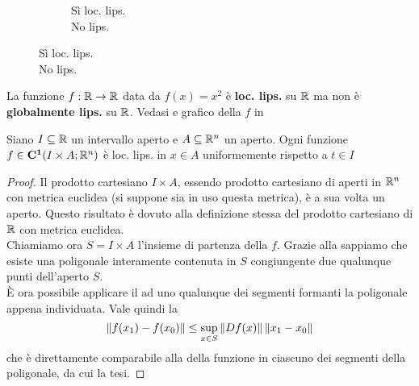 \begin{example}
\begin{figure}[H]
\begin{subfigure}{.24\textwidth}
{
			}
			\caption{Sì loc. lips.\\ No lips.}
		\end{subfigure}
	\end{figure}
\end{example}
\begin{example}
	La funzione $f:\mathbb{R}\to \mathbb{R}$ data da $f(x)=x^2$ è \textbf{loc. lips.} su $\mathbb{R}$ ma non è \textbf{globalmente lips.} su $\mathbb{R}$. Vedasi  e grafico della $f$ in 
\end{example}

\begin{proposition}
	\label{prop:fc1_loc_lips}
	Siano $I\subseteq \mathbb{R}$ un intervallo aperto e $A\subseteq \mathbb{R}^n$ un aperto. Ogni funzione $f\in\mathbf{C^{1}}(I\times A;\mathbb{R}^n)$ è loc. lips. in $x\in A$ uniformemente rispetto a $t\in I$
	\begin{proof}
		Il prodotto cartesiano $I\times A$, essendo prodotto cartesiano di aperti in $\mathbb{R}^n$ con metrica euclidea (si suppone sia in uso questa metrica), è a sua volta un aperto. Questo risultato è dovuto alla definizione stessa del prodotto cartesiano di $\mathbb{R}$ con metrica euclidea.\\
		Chiamiamo ora $S=I\times A$ l'insieme di partenza della $f$. Grazie alla  sappiamo che esiste una poligonale interamente contenuta in $S$ congiungente due qualunque punti dell'aperto $S$.\\
		È ora possibile applicare il  ad uno qualunque dei segmenti formanti la poligonale appena individuata. Vale quindi la
		\[\left\|f(x_1)-f(x_0)\right\| \leq \sup\limits_{x\in S}\left\|Df(x)\right\|\left\|x_1-x_0\right\|\]
		che è direttamente comparabile alla  della funzione in ciascuno dei segmenti della poligonale, da cui la tesi.
	\end{proof}
\end{proposition}

